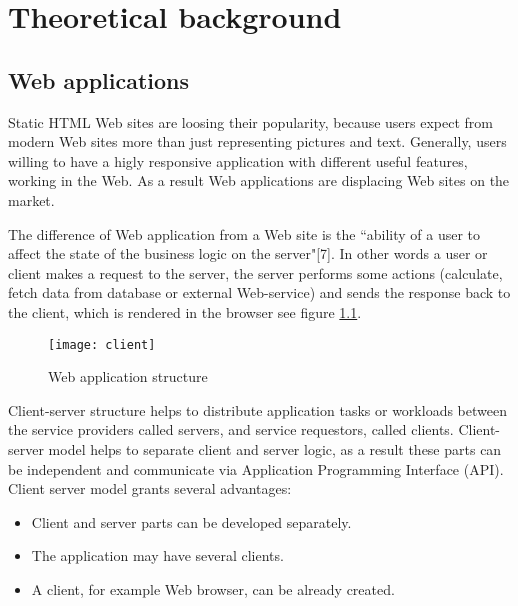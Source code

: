 \chapter{Theoretical background}
\label{ch:background} 
	\section{Web applications}
		
	  Static HTML Web sites are loosing their popularity, because users
	  expect from modern Web sites more than just representing pictures and text.
	  Generally, users willing to have a higly responsive application with different useful
	  features, working in the Web. As a result Web applications are displacing Web
	  sites on the market.
	  
	   The difference of Web application from a Web site is the
	 ``ability of a user to affect the state of the business logic on the
	 server"[7]. In other words a user or client makes a request to the server,
	 the server performs some actions (calculate, fetch data from database or
	 external Web-service) and sends the response back to the client, which is rendered in the browser see
	  figure \ref{fig:pic1}.
	  
	  \begin{figure}
      	\texttt{[image: client]}
      	\caption{Web application structure}
      	\label{fig:pic1}
      \end{figure}
	  
    	Client-server structure helps to distribute application tasks or workloads
    	between the service providers called servers, and service requestors,
    	called clients. Client-server model helps to separate client and server logic, as
    	a result these parts can be independent and communicate via Application
    	Programming Interface (API). Client server model grants several advantages:
    	\begin{itemize}
    	  \item Client and server parts can be developed separately.
    	  \item The application may have several clients.
    	  \item A client, for example Web browser, can be already created.
    	\end{itemize}
    		
